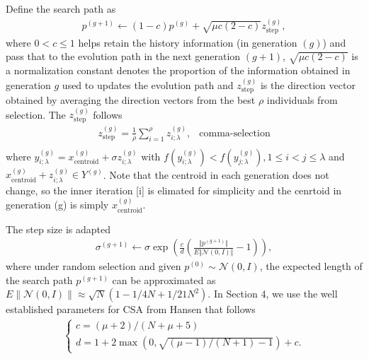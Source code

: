 Define the search path as 
\begin{align}
p^{(g+1)} \leftarrow (1-c)p^{(g)} + \sqrt{\mu c (2-c)} z_{\text{step}}^{(g)},
\end{align}
where $0<c \leq 1$ helps retain the history information (in generation $(g)$) and pass that to the evolution path in the next generation $(g+1)$, $ \sqrt{\mu c (2-c)}$ is a normalization constant denotes the proportion of the information obtained in generation $g$ used to updates the evolution path and $z_{\text{step}}^{(g)}$ is the direction vector obtained by averaging the direction vectors from the best $\rho$ individuals from selection. The $z_{\text{step}}^{(g)}$ follows
\begin{align}
z_{\text{step}}^{(g)} = 
 \frac{1}{\rho} \sum_{i=1}^\rho z_{i;\lambda}^{(g)},& \text{comma-selection}\\
\end{align}
where $y_{i;\lambda}^{(g)} = x_{\text{centroid}}^{(g)} +\sigma z_{i;\lambda}^{(g)}$ with $f(y_{i;\lambda}^{(g)} )< f(y_{j;\lambda}^{(g)}), 1 \leq i < j \leq \lambda$ and $x_{\text{centroid}}^{(g)} + z_{i;\lambda}^{(g)} \in Y^{(g)}$. Note that the centroid in each generation does not change, so the inner iteration [i] is elimated for simplicity and the cenrtoid in generation (g) is simply $x_{\text{centroid}}^{(g)}$. 

The step size is adapted 
\begin{align}
\sigma^{(g+1)} \leftarrow \sigma \exp \left (  \frac{c}{d}  \left( \frac{\Vert p^{(g+1)}\Vert}{E \Vert \mathcal{N}(0,I)\Vert } -1 \right) \right ),
\end{align}
where under random selection and given $p^{(0)}\sim \mathcal{N}(0,I)$, the expected length of the search path $p^{(g+1)}$ can be approximated as $E\| \mathcal{N}(0,I) \| \approx \sqrt{N} (1-1/4N + 1/21N^2)$. In Section 4, we use the well established parameters for CSA from  Hansen \cite{hansen2016cma} that follows 
\begin{align}
\begin{cases}
c = (\mu+2)/(N+\mu+5)\\
d=1+2 \max\left (0, \sqrt{(\mu-1)/(N+1)-1} \right)+c.
\end{cases}
\end{align}


